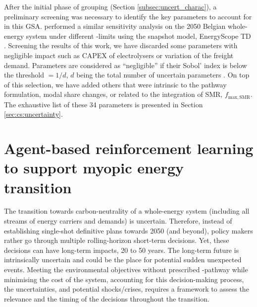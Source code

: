 After the initial phase of grouping (Section \ref{subsec:uncert_charac}), a preliminary screening was necessary to identify the key parameters to account for in this \gls{GSA}. \citet{rixhon2021role} performed a similar sensitivity analysis on the 2050 Belgian whole-energy system under different -limits using the snapshot model, EnergyScope TD \cite{limpens2019energyscope}. Screening the results of this work, we have discarded some parameters with negligible impact such as CAPEX of electrolysers or variation of the freight demand. Parameters are considered as ``negligible'' if their Sobol' index is below the threshold $=1/d$, $d$ being the total number of uncertain parameters \cite{Turati2017}. On top of this selection, we have added others that were intrinsic to the pathway formulation, \eg modal share changes, or related to the integration of \gls{SMR}, $f_{\mathrm{max,SMR}}$. The exhaustive list of these 34 parameters is presented in Section \ref{sec:cs:uncertainty}.


\section{Agent-based reinforcement learning to support myopic energy transition}
\label{sec:meth:RL}

The transition towards carbon-neutrality of a whole-energy system (\ie including all streams of energy carriers and demands) is uncertain. Therefore, instead of establishing single-shot definitive plans towards 2050 (and beyond), policy makers rather go through multiple rolling-horizon short-term decisions. Yet, these decisions can have long-term impacts, 20 to 50 years. The long-term future is intrinsically uncertain and could be the place for potential sudden unexpected events. Meeting the environmental objectives without prescribed -pathway while minimising the cost of the system, accounting for this decision-making process, the uncertainties, and potential shocks/crises, requires a framework to assess the relevance and the timing of the decisions throughout the transition. 

